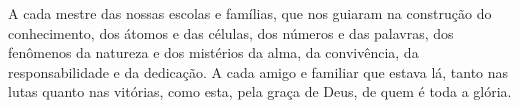 
\begin{espacosimples}
\noindent A cada mestre das nossas escolas e famílias, que nos guiaram na construção do conhecimento, dos átomos e das células, dos números e das palavras, dos fenômenos da natureza e dos mistérios da alma, da convivência, da responsabilidade e da dedicação. A cada amigo e familiar que estava lá, tanto nas lutas quanto nas vitórias, como esta, pela graça de Deus, de quem é toda a glória. 
\end{espacosimples}